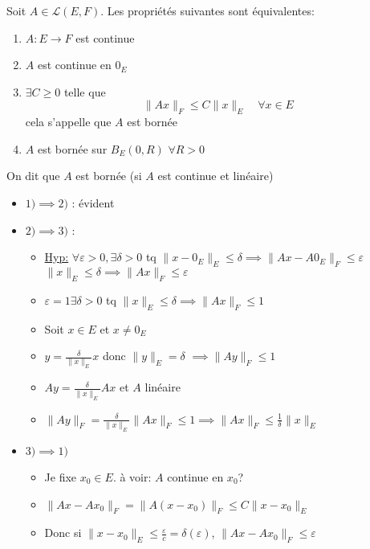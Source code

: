 \begin{theorem}
    Soit $A \in \mathcal{L}(E, F)$. Les propriétés suivantes sont équivalentes:
    \begin{enumerate}
        \item $A: E \to F$ est continue
        \item $A$ est continue en  $0_E$
        \item  $\exists C \ge 0$ telle que 
            \[
            \|Ax\|_F \le C\|x\|_E \quad \forall x \in E
            \] 
            cela s'appelle que $A$ est bornée
        \item $A$ est bornée sur  $B_E(0, R)$ $\forall R > 0$
    \end{enumerate}
    On dit que $A$ est bornée (si $A$ est continue et linéaire)
\end{theorem}
\begin{preuve}
    \begin{itemize}
        \item $1) \implies 2)$ : évident
        \item $2) \implies 3)$ : 
            \begin{itemize}
                \item 
                    \underline{Hyp:} $\forall \varepsilon >0, \exists \delta > 0$ tq $\|x - 0_E\|_E \le \delta \implies \|Ax - A0_E\|_F \le \varepsilon$ $\|x\|_E \le \delta \implies \|Ax\|_F \le \varepsilon$
                \item $\varepsilon = 1 \exists \delta > 0$ tq $\|x\|_E \le \delta \implies \|Ax\|_F \le 1$
                \item Soit $ x \in E$ et $x \neq 0_E$
                \item $y = \frac{\delta}{\|x\|_E}x$ donc $\|y\|_E = \delta$  $\implies\|Ay\|_F \le 1$
                \item $Ay = \frac{\delta}{\|x\|_{E}}Ax$ et $A$ linéaire
                \item  $\|Ay\|_{F} = \frac{\delta}{\|x\|_E}\|Ax\|_F \le 1 \implies \|Ax\|_F \le \frac{1}{\delta}\|x\|_E$
            \end{itemize}
        \item $3) \implies 1)$ 
            \begin{itemize}
                \item Je fixe $x_0 \in E$. à voir: $A$ continue en  $x_0$?
                \item $\|Ax - Ax_0\|_F = \|A(x - x_0)\|_F \le C\|x - x_0\|_E$
                \item Donc si $\|x - x_0\|_E \le \frac{\varepsilon}{c} = \delta(\varepsilon)$, $\|Ax - Ax_0\|_F \le \varepsilon$
            \end{itemize}
    \end{itemize}
\end{preuve}

